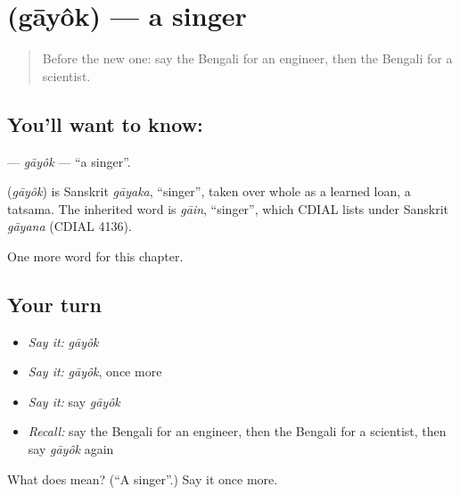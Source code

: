 \section[\texorpdfstring{\bn{গায়ক} (gāyôk)}{গায়ক (gāyôk)}]{ (gāyôk) — a singer}

\label{lesson:BN-C177-gayok}



\begin{quote}
Before the new one: say the Bengali for an engineer, then the Bengali for a scientist.
\end{quote}

\subsection*{You'll want to know: }
\textbf{} — \emph{gāyôk} — \textquotedblleft{}a singer\textquotedblright{}.

\begin{cousinweb}
\textbf{} (\emph{gāyôk}) is Sanskrit \emph{gāyaka}, \textquotedblleft{}singer\textquotedblright{}, taken over whole as a learned loan, a tatsama. The inherited word is \emph{gāin}, \textquotedblleft{}singer\textquotedblright{}, which CDIAL lists under Sanskrit \emph{gāyana} (CDIAL 4136).
\end{cousinweb}

\begin{grammarlens}[title={What you've built}]
One more word for this chapter.
\end{grammarlens}

\subsection*{Your turn}
\begin{itemize}
\raggedright
  \item \emph{Say it:} \emph{gāyôk}
  \item \emph{Say it:} \emph{gāyôk}, once more
  \item \emph{Say it:} say \emph{gāyôk}
  \item \emph{Recall:} say the Bengali for an engineer, then the Bengali for a scientist, then say \emph{gāyôk} again
\end{itemize}

\begin{tcolorbox}[breakable,colback=teal!4,colframe=teal!35!black,title={Before you move on}]
What does  mean? (\textquotedblleft{}A singer\textquotedblright{}.) Say it once more.
\end{tcolorbox}
